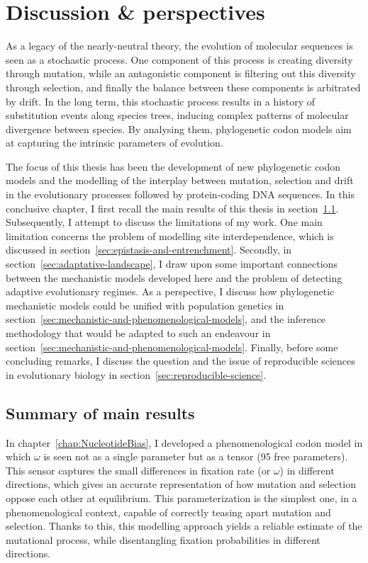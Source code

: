 \chapter{Discussion \& perspectives}
\label{ch:discussion-perspectives}
{\hypersetup{linkcolor=GREYDARK}\minitoc}

As a legacy of the nearly-neutral theory, the evolution of molecular sequences is seen as a stochastic process.
One component of this process is creating diversity through mutation, while an antagonistic component is filtering out this diversity through selection, and finally the balance between these components is arbitrated by drift.
In the long term, this stochastic process results in a history of substitution events along species trees, inducing complex patterns of molecular divergence between species.
By analysing them, phylogenetic codon models aim at capturing the intrinsic parameters of evolution.

The focus of this thesis has been the development of new phylogenetic codon models and the modelling of the interplay between mutation, selection and drift in the evolutionary processes followed by protein-coding DNA sequences.
In this conclusive chapter, I first recall the main results of this thesis in section~\ref{sec:summary-of-main-results}.
Subsequently, I attempt to discuss the limitations of my work.
One main limitation concerns the problem of modelling site interdependence, which is discussed in section~\ref{sec:epistasis-and-entrenchment}.
Secondly, in section~\ref{sec:adaptative-landscape}, I draw upon some important connections between the mechanistic models developed here and the problem of detecting adaptive evolutionary regimes.
As a perspective, I discuss how phylogenetic mechanistic models could be unified with population genetics in section~\ref{sec:mechanistic-and-phenomenological-models}, and the inference methodology that would be adapted to such an endeavour in section~\ref{sec:mechanistic-and-phenomenological-models}.
Finally, before some concluding remarks, I discuss the question and the issue of reproducible sciences in evolutionary biology in section~\ref{sec:reproducible-science}.


\section{Summary of main results}
\label{sec:summary-of-main-results}

In chapter~\ref{chap:NucleotideBias}, I developed a phenomenological codon model in which $\omega$ is seen not as a single parameter but as a tensor (95 free parameters).
This sensor captures the small differences in fixation rate (or $\omega$) in different directions, which gives an accurate representation of how mutation and selection oppose each other at equilibrium.
This parameterization is the simplest one, in a phenomenological context, capable of correctly teasing apart mutation and selection.
Thanks to this, this modelling approach yields a reliable estimate of the mutational process, while disentangling fixation probabilities in different directions.

